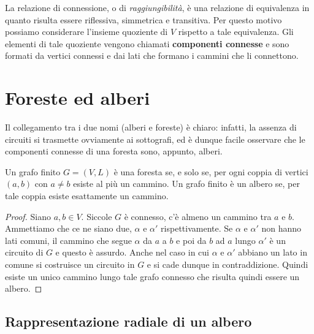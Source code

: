 \begin{osservation}
	La relazione di connessione, o di \textit{raggiungibilità}, è una relazione di equivalenza in quanto risulta essere riflessiva, simmetrica e transitiva. Per questo motivo possiamo considerare l'insieme quoziente di $V$ rispetto a tale equivalenza. Gli elementi di tale quoziente vengono chiamati \textbf{componenti connesse} e sono formati da vertici connessi e dai lati che formano i cammini che li connettono.
\end{osservation}


\section{Foreste ed alberi}


Il collegamento tra i due nomi (alberi e foreste) è chiaro: infatti, la assenza di circuiti si trasmette ovviamente ai sottografi, ed è dunque facile osservare che le componenti connesse di una foresta sono, appunto, alberi.


\begin{teorbox}
	    Un grafo finito $G=(V,L)$ è una foresta se, e solo se, per ogni coppia di vertici $(a,b)$ con $a \neq b$ esiste al più un cammino. Un grafo finito è un albero se, per tale coppia esiste esattamente un cammino.
\end{teorbox}

\begin{proof}
	Siano $a,b \in V$. Siccole $G$ è connesso, c'è almeno un cammino tra $a$ e $b$. Ammettiamo che ce ne siano due, $\alpha$ e $\alpha'$ rispettivamente. Se $\alpha$ e $\alpha'$ non hanno lati comuni, il cammino che segue $\alpha$ da $a$ a $b$ e poi da $b$ ad $a$ lungo $\alpha'$ è un circuito di $G$ e questo è assurdo. Anche nel caso in cui $\alpha$ e $\alpha'$ abbiano un lato in comune si costruisce un circuito in $G$ e si cade dunque in contraddizione. Quindi esiste un unico cammino lungo tale grafo connesso che risulta quindi essere un albero.
\end{proof}

\subsection{Rappresentazione radiale di un albero}

